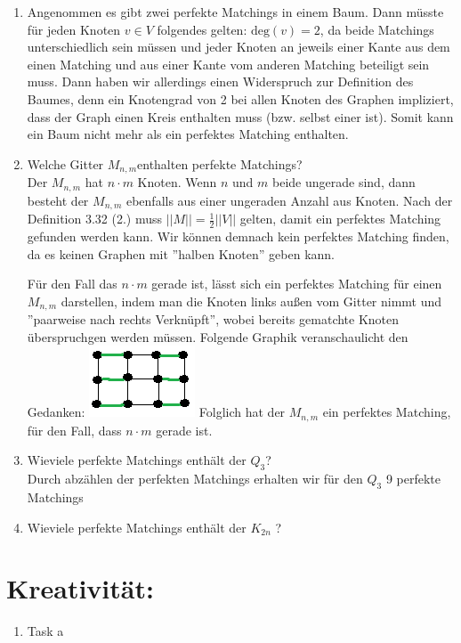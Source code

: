 \begin{enumerate}[label=(\alph*)]
        \item 
        Angenommen es gibt zwei perfekte Matchings in einem Baum. Dann müsste für jeden Knoten $v \in V$ folgendes gelten: $\textrm{deg}(v) = 2$, da beide Matchings unterschiedlich sein müssen und jeder Knoten an jeweils einer Kante aus dem einen Matching und aus einer Kante vom anderen Matching beteiligt sein muss. Dann haben wir allerdings einen Widerspruch zur Definition des Baumes, denn ein Knotengrad von 2 bei allen Knoten des Graphen impliziert, dass der Graph einen Kreis enthalten muss (bzw. selbst einer ist). Somit kann ein Baum nicht mehr als ein perfektes Matching enthalten. 
        
        \item 
        Welche Gitter $M_{n,m} $enthalten perfekte Matchings? \\
        Der $M_{n,m}$ hat $n \cdot m$ Knoten. Wenn $n$ und $m$ beide ungerade sind, dann besteht der $M_{n,m}$ ebenfalls aus einer ungeraden Anzahl aus Knoten. Nach der Definition 3.32 (2.) muss $||M|| = \frac{1}{2} ||V||$ gelten, damit ein perfektes Matching gefunden werden kann. Wir können demnach kein perfektes Matching finden, da es keinen Graphen mit ''halben Knoten'' geben kann. \par
        Für den Fall das $n \cdot m$ gerade ist, lässt sich ein perfektes Matching für einen $M_{n,m}$ darstellen, indem man die Knoten links außen vom Gitter nimmt und ''paarweise nach rechts Verknüpft'', wobei bereits gematchte Knoten überspruchgen werden müssen. Folgende Graphik veranschaulicht den Gedanken:
        \includegraphics{task_h}
        Folglich hat der $M_{n,m}$ ein perfektes Matching, für den Fall, dass $n \cdot m$ gerade ist.
        
        \item
        Wieviele perfekte Matchings enthält der $Q_3$? \\
        Durch abzählen der perfekten Matchings erhalten wir für den $Q_3$ 9 perfekte Matchings
        \item 
        Wieviele perfekte Matchings enthält der $K_{2n}$ ?
        
    \end{enumerate}
    \section*{Kreativität:}
    \begin{enumerate}[label=(\alph*)]
    	\item Task a
    \end{enumerate}
